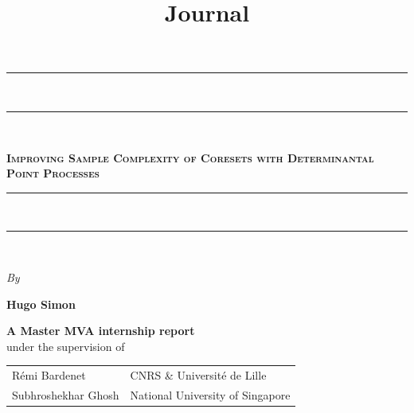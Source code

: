 \documentclass{report} %
\newcommand{\1}{\mathds{1}} %
\theoremstyle{definition} %
\begin{document}
    \title{Journal}

\begin{titlepage}
    \begin{center}
        \vspace*{25pt} {
        \begin{spacing}{0.05}
            \rule{400pt}{2pt}\\
            \rule{400pt}{0.75pt}\\
        \end{spacing}
        \vspace{20pt}
        \begin{spacing}{0.9}
            \fontsize{23.6pt}{26pt}\selectfont%
            \textsc{\textbf{Improving Sample Complexity of Coresets with Determinantal Point Processes}}\\%
        \end{spacing}
        \vspace{5pt}
        \begin{spacing}{0.05}
            \rule{400pt}{0.75pt}\\
            \rule{400pt}{2pt}\\
        \end{spacing}
        }
    
        \vspace*{1cm}
        \begin{large}
        \textit{By}\\%
        \end{large}
    
    
        \vspace*{4pt}
        \begin{Large}
        \textbf{Hugo Simon}\\%
        \end{Large}
    
    \begin{large}
        \vspace*{5cm}
        \textbf{
        A Master MVA internship report }
        \vspace*{6pt}\\
        under the supervision of
        \vspace*{20pt}\\
    
        \begin{longtable*}{ p{0.4\textwidth} p{0.5\textwidth} }
            R\'emi Bardenet & CNRS \& Université de Lille
            \tabularnewline Subhroshekhar Ghosh & National University of Singapore
            \tabularnewline
        \end{longtable*}
    \end{large}
    

\end{center}
\end{titlepage}
\end{document}

